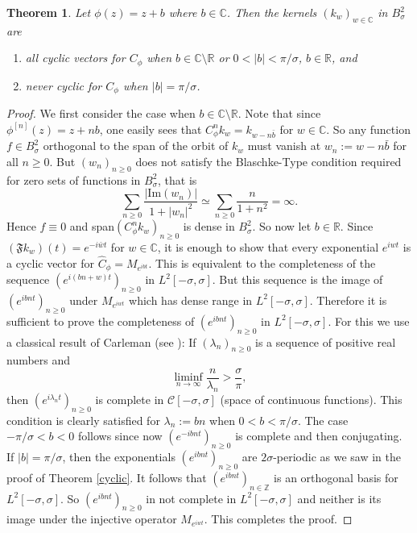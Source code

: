 \documentclass[11pt]{amsart}%
\numberwithin{equation}{section}
\theoremstyle{plain}
\newtheorem{thm}{Theorem}[section]
\theoremstyle{definition}
\theoremstyle{definition}
\begin{document}
\begin{thm}\label{cyclic vector}Let $\phi(z)=z+b$ where $b\in \mathbb{C}$. Then the kernels $(k_w)_{w\in\mathbb{C}}$ in $B^2_\sigma$ are 
\begin{enumerate}
\item all cyclic vectors for $C_\phi$ when $b\in\mathbb{C}\setminus\mathbb{R}$ or $0<|b|<\pi/\sigma$, $b\in\mathbb{R}$, and
\item never cyclic for $C_\phi$ when $|b|=\pi/\sigma$. 
\end{enumerate}
\end{thm}
\begin{proof} We first consider the case when $b\in\mathbb{C}\setminus\mathbb{R}$. Note that since $\phi^{[n]}(z)=z+nb$, one easily sees that $C_{\phi}^nk_w=k_{w-n\bar{b}}$ for $w\in\mathbb{C}$. So any function $f\in B^2_\sigma$ orthogonal to the span of the orbit of $k_w$ must vanish at $w_n:=w-n\bar{b}$ for all $n\geq 0$. But $(w_n)_{n\geq 0}$ does not satisfy the Blaschke-Type condition required for zero sets of functions in $B^2_\sigma$, that is
\[
\sum_{n\geq 0}\frac{|\mathrm{Im}(w_n)|}{1+|w_n|^2}\simeq \sum_{n\geq 0}\frac{n}{1+n^2}=\infty.
\]
Hence $f\equiv 0$ and span$(C_{\phi}^nk_w)_{n\geq 0}$ is dense in $B^2_\sigma$. So now let $b\in\mathbb{R}$. Since $(\mathfrak{F}k_w)(t)=e^{-i\bar{w}t}$ for $w\in\mathbb{C}$, it is enough to show that every exponential $e^{iwt}$ is a cyclic vector for $\widehat{C}_\phi=M_{e^{ibt}}$. This is equivalent to the completeness of the sequence $(e^{i(bn+w)t})_{n\geq 0}$ in $L^2[-\sigma,\sigma]$. But this sequence is the image of $(e^{ibnt})_{n\geq 0}$ under  $M_{e^{iwt}}$ which has dense range in $L^2[-\sigma,\sigma]$. Therefore it is sufficient to prove the completeness of $(e^{ibnt})_{n\geq 0}$ in $L^2[-\sigma,\sigma]$. For this we use a classical result of Carleman (see \cite[page 97]{young}): If $(\lambda_n)_{n\geq 0}$ is a sequence of positive real numbers and 
\[
\liminf_{n\to\infty}\frac{n}{\lambda_n}>\frac{\sigma}{\pi},
\]
then $(e^{i\lambda_nt})_{n\geq0}$ is complete in $\mathcal{C}[-\sigma,\sigma]$ (space of continuous functions). This condition is clearly satisfied for $\lambda_n:=bn$ when $0<b<\pi/\sigma$. The case $-\pi/\sigma<b<0$ follows since now $(e^{-ibnt})_{n\geq0}$ is complete and then conjugating. If $|b|=\pi/\sigma$, then the exponentials $(e^{ibnt})_{n\geq0}$ are $2\sigma$-periodic as we saw in the proof of Theorem \ref{cyclic}. It follows that $(e^{ibnt})_{n\in\mathbb{Z}}$ is an orthogonal basis for $L^2[-\sigma,\sigma]$. So $(e^{ibnt})_{n\geq0}$ in not complete in $L^2[-\sigma,\sigma]$ and neither is its image under the injective operator $M_{e^{iwt}}$. This completes the proof.
\end{proof}
\end{document}
